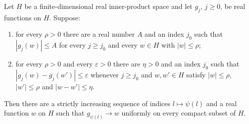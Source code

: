 \begin{lemma}
Let $H$ be a finite-dimensional real inner-product space and let $g_j$, $j\ge0$,
be real functions on $H$. Suppose:
\begin{enumerate}
\item[(i)] for every $\rho>0$ there are a real number $A$ and an index $j_0$ such
that $|g_j(w)|\le A$ for every $j\ge j_0$ and every $w\in H$ with $|w|\le\rho$;
\item[(ii)] for every $\rho>0$ and every $\varepsilon>0$ there are $\eta>0$ and
an index $j_0$ such that $|g_j(w)-g_j(w')|\le\varepsilon$ whenever $j\ge j_0$ and
$w,w'\in H$ satisfy $|w|\le\rho$, $|w'|\le\rho$ and $|w-w'|\le\eta$.
\end{enumerate}
Then there are a strictly increasing sequence of indices $l\mapsto\psi(l)$ and a
real function $w$ on $H$ such that $g_{\psi(l)}\to w$ uniformly on every compact
subset of $H$.
\end{lemma}
